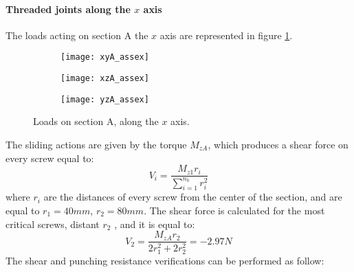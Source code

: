 \paragraph{Threaded joints along the $x$ axis} The loads acting on section A the $x$ axis are represented in figure \ref{fig:sectionxA}.\\
\begin{figure}[bth]
    \centering
    \begin{subfigure}{0.32\linewidth}
    	\centering \texttt{[image: xyA\_assex]} 
	\end{subfigure}
	\begin{subfigure}{0.32\linewidth}
		\centering \texttt{[image: xzA\_assex]}
	\end{subfigure}
	\begin{subfigure}{0.32\linewidth}
		\centering \texttt{[image: yzA\_assex]} 
	\end{subfigure}    
    \caption{Loads on section A, along the $x$ axis.}
    \label{fig:sectionxA}
\end{figure}
The sliding actions are given by the torque $M_{zA}$, which produces a shear force on every screw equal to:\\
\begin{equation*}
    V_{i} = \frac{M_{z1}r_{i}}{\sum\limits_{i=1}^{n_{{b}}} r^2_{i}}
\end{equation*}
where $r_{i}$ are the distances of every screw from the center of the section, and are equal to $r_{1} = 40 mm$, $r_{2} = 80 mm$. 
The shear force is calculated for the most critical screws, distant $r_{2}$ , and it is equal to:\\
\begin{equation*}
    V_{2} = \frac{M_{zA}r_{2}}{2r^2_{1}+2r^2_{2}} = - 2.97 N
\end{equation*}
The shear and punching resistance verifications can be performed as follow:
